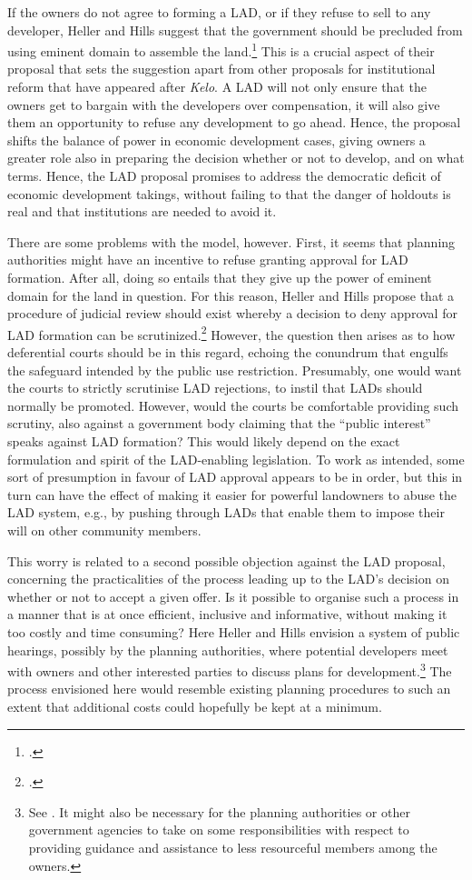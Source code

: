 If the owners do not agree to forming a LAD, or if they refuse to sell to any developer, Heller and Hills suggest that the government should be precluded from using eminent domain to assemble the land.\footcite[1491]{heller08} This is a crucial aspect of their proposal that sets the suggestion apart from other proposals for institutional reform that have appeared after {\it Kelo}. A LAD will not only ensure that the owners get to bargain with the developers over compensation, it will also give them an opportunity to refuse any development to go ahead. Hence, the proposal shifts the balance of power in economic development cases, giving owners a greater role also in preparing the decision whether or not to develop, and on what terms. Hence, the LAD proposal promises to address the democratic deficit of economic development takings, without failing to  that the danger of holdouts is real and that institutions are needed to avoid it.

There are some problems with the model, however. First, it seems that planning authorities might have an incentive to refuse granting approval for LAD formation. After all, doing so entails that they give up the power of eminent domain for the land in question. For this reason, Heller and Hills propose that a procedure of judicial review should exist whereby a decision to deny approval for LAD formation can be scrutinized.\footcite[1490]{heller08} However, the question then arises as to how deferential  courts should be in this regard, echoing the conundrum that engulfs the safeguard intended by the public use restriction. Presumably, one would want the courts to strictly scrutinise LAD rejections, to instil that LADs should normally be promoted. However, would the courts be comfortable providing such scrutiny, also against a government body claiming that the ``public interest'' speaks against LAD formation? This would likely depend on the exact formulation and spirit of the LAD-enabling legislation. To work as intended, some sort of presumption in favour of LAD approval appears to be in order, but this in turn can have the effect of making it easier for powerful landowners to abuse the LAD system, e.g., by pushing through LADs that enable them to impose their will on other community members.

This worry is related to a second possible objection against the LAD proposal, concerning the practicalities of the process leading up to the LAD's decision on whether or not to accept a given offer. Is it possible to organise such a process in a manner that is at once efficient, inclusive and informative, without making it too costly and time consuming? Here Heller and Hills envision a system of public hearings, possibly  by the planning authorities, where potential developers meet with owners and other interested parties to discuss plans for development.\footnote{See \cite[1490-1491]{heller08}. It might also be necessary for the planning authorities or other government agencies to take on some responsibilities with respect to providing guidance and assistance to less resourceful members among the owners.} The process envisioned here would resemble existing planning procedures to such an extent that additional costs could hopefully be kept at a minimum. 

